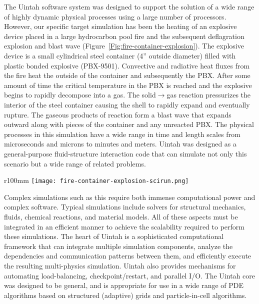 The Uintah software system was designed to support the solution of a
wide range of highly dynamic physical processes using a large number
of processors.  However, our specific target simulation has been the
heating of an explosive device placed in a large hydrocarbon pool fire
and the subsequent deflagration explosion and blast wave
(Figure~\ref{Fig:fire-container-explosion}). The explosive device is a
small cylindrical steel container (4'' outside diameter) filled with
plastic bonded explosive (PBX-9501). Convective and radiative heat
fluxes from the fire heat the outside of the container and
subsequently the PBX. After some amount of time the critical
temperature in the PBX is reached and the explosive begins to rapidly
decompose into a gas. The solid$\rightarrow$gas reaction pressurizes the interior
of the steel container causing the shell to rapidly expand and
eventually rupture. The gaseous products of reaction form a blast wave
that expands outward along with pieces of the container and any
unreacted PBX. The physical processes in this simulation have a wide
range in time and length scales from microseconds and microns to
minutes and meters.  Uintah was designed as a general-purpose
fluid-structure interaction code that can simulate not only this
scenario but a wide range of related problems.

\begin{wrapfigure}{r}{100mm}
  \texttt{[image: fire-container-explosion-scirun.png]}
  \caption{Target Simulation - Fire-Container-Explosion.}
  \label{Fig:fire-container-explosion}
\end{wrapfigure}


Complex simulations such as this require both immense computational
power and complex software. Typical simulations include solvers for
structural mechanics, fluids, chemical reactions, and material
models. All of these aspects must be integrated in an efficient manner
to achieve the scalability required to perform these simulations. The
heart of Uintah is a sophisticated computational framework that can
integrate multiple simulation components, analyze the dependencies and
communication patterns between them, and efficiently execute the
resulting multi-physics simulation.  Uintah also provides mechanisms
for automating load-balancing, checkpoint/restart, and parallel
I/O. The Uintah core was designed to be general, and is appropriate
for use in a wide range of PDE algorithms based on structured
(adaptive) grids and particle-in-cell algorithms.


